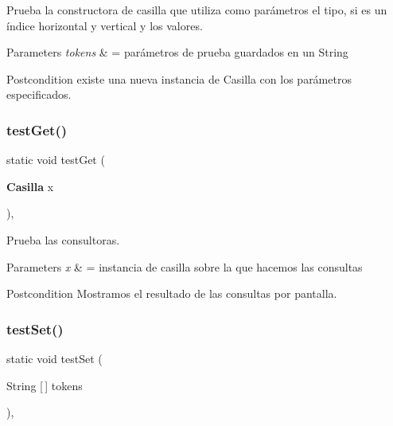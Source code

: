 Prueba la constructora de casilla que utiliza como parámetros el tipo, si es un índice horizontal y vertical y los valores. 


\begin{DoxyParams}{Parameters}
{\em tokens} & = parámetros de prueba guardados en un String \\
\hline
\end{DoxyParams}
\begin{DoxyPostcond}{Postcondition}
existe una nueva instancia de Casilla con los parámetros especificados. 
\end{DoxyPostcond}
\mbox{\label{class_dominio_1_1controladores_1_1_drivers_1_1_driver_casilla_ab71ac02a96b2b1ba055506e8624a258e}} 
\subsubsection{test\+Get()}
{\footnotesize\ttfamily static void test\+Get (\begin{DoxyParamCaption}\item[{\textbf{ Casilla}}]{x }\end{DoxyParamCaption})\hspace{0.3cm}{\ttfamily [inline]}, {\ttfamily [static]}}



Prueba las consultoras. 


\begin{DoxyParams}{Parameters}
{\em x} & = instancia de casilla sobre la que hacemos las consultas \\
\hline
\end{DoxyParams}
\begin{DoxyPostcond}{Postcondition}
Mostramos el resultado de las consultas por pantalla. 
\end{DoxyPostcond}
\mbox{\label{class_dominio_1_1controladores_1_1_drivers_1_1_driver_casilla_a29ea705eae55e0ca62c0211e5ee33aec}} 
\subsubsection{test\+Set()}
{\footnotesize\ttfamily static void test\+Set (\begin{DoxyParamCaption}\item[{String [$\,$]}]{tokens }\end{DoxyParamCaption})\hspace{0.3cm}{\ttfamily [inline]}, {\ttfamily [static]}}



